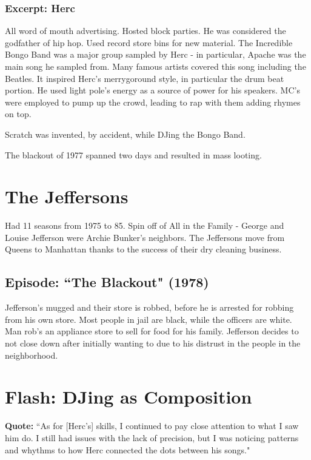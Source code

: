 \documentclass[12pt, a4paper, twoside, openright, titlepage]{book}
\begin{document}
\subsubsection{Excerpt: Herc}


All word of mouth advertising. Hosted block parties. He was considered the godfather of hip hop. Used record store bins for new material. The Incredible Bongo Band was a major group sampled by Herc - in particular, Apache was the main song he sampled from. Many famous artists covered this song including the Beatles. It inspired Herc's merrygoround style, in particular the drum beat portion. He used light pole's energy as a source of power for his speakers. MC's were employed to pump up the crowd, leading to rap with them adding rhymes on top. 


Scratch was invented, by accident, while DJing the Bongo Band. 


The blackout of 1977 spanned two days and resulted in mass looting.

\section{The Jeffersons}

Had 11 seasons from 1975 to 85. Spin off of All in the Family - George and Louise Jefferson were Archie Bunker's neighbors. The Jeffersons move from Queens to Manhattan thanks to the success of their dry cleaning business.

\subsection{Episode: ``The Blackout" (1978)}

Jefferson's mugged and their store is robbed, before he is arrested for robbing from his own store. Most people in jail are black, while the officers are white. Man rob's an appliance store to sell for food for his family. Jefferson decides to not close down after initially wanting to due to his distrust in the people in the neighborhood.

\section{Flash: DJing as Composition}


\textbf{Quote:} ``As for [Herc's] skills, I continued to pay close attention to what I saw him do. I still had issues with the lack of precision, but I was noticing patterns and whythms to how Herc connected the dots between his songs."
\end{document}
